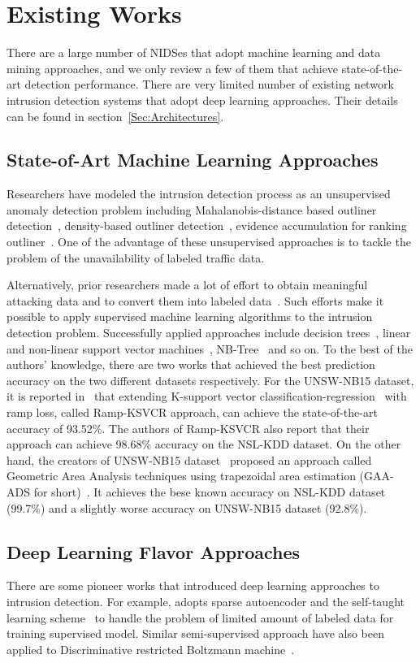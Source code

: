 \section{Existing Works}
There are a large number of NIDSes that adopt machine learning and data mining approaches, and we only review a few of them that achieve state-of-the-art detection performance.
There are very limited number of existing network intrusion detection systems that adopt
deep learning approaches.
Their details can be found in section~\ref{Sec:Architectures}.

\subsection{State-of-Art Machine Learning Approaches}
Researchers have modeled the intrusion detection process as an unsupervised
anomaly detection problem including Mahalanobis-distance based outliner detection~\cite{ComparativeAnomalyNIDS}, density-based outliner detection~\cite{LOF, ComparativeAnomalyNIDS},
evidence accumulation for ranking outliner~\cite{RankingOutliner}.
One of the advantage of these unsupervised approaches is to tackle the problem of
the unavailability of labeled traffic data.

Alternatively, prior researchers made a lot of effort to obtain meaningful
attacking data and to convert them into labeled data~\cite{DARPA, KDDCup, NSL-KDD, UNSW, UNSW1}.
Such efforts make it possible to apply supervised machine learning algorithms to the
intrusion detection problem.
Successfully applied approaches include decision trees~\cite{DecisionTree},
linear and non-linear support vector machines~\cite{SVM}, NB-Tree~\cite{NB-Tree} and so on.
To the best of the authors' knowledge, there are two works that achieved the best prediction
accuracy on the two different datasets respectively.
For the UNSW-NB15 dataset, it is reported in~\cite{RampLossKSVCR} that extending K-support vector
classification-regression~\cite{KSVCR} with ramp loss, called Ramp-KSVCR approach, can achieve the state-of-the-art accuracy of 93.52\%.
The authors of Ramp-KSVCR also report that their approach can achieve 98.68\% accuracy on the NSL-KDD dataset.
On the other hand, the creators of UNSW-NB15 dataset~\cite{UNSW} proposed an approach called
Geometric Area Analysis techniques using trapezoidal area estimation (GAA-ADS for short)~\cite{GAA-ADS}.
It achieves the bese known accuracy on NSL-KDD dataset (99.7\%) and a slightly worse accuracy on
UNSW-NB15 dataset (92.8\%).


\subsection{Deep Learning Flavor Approaches}
There are some pioneer works that introduced deep learning approaches to intrusion detection.
For example, \cite{STL-NIDS} adopts sparse autoencoder and the self-taught learning
scheme~\cite{SparseAE} to handle the problem of limited amount of labeled data for training supervised model.
Similar semi-supervised approach have also been applied to
Discriminative restricted Boltzmann machine~\cite{AnomalyDetectionRBM}.
